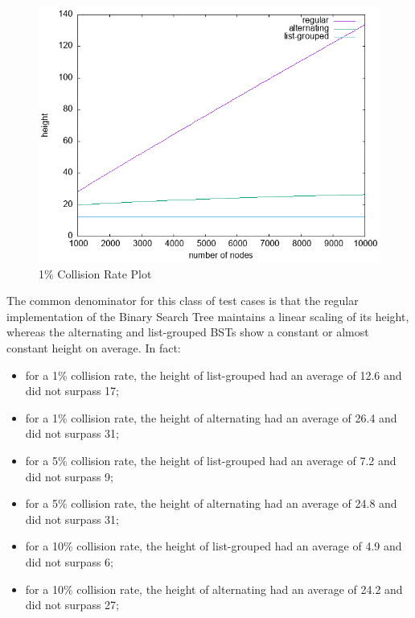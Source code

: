 \documentclass[fleqn,10pt]{SelfArx} %
\begin{document}
\begin{figure}[ht]\centering
	\includegraphics[width=\linewidth]{Figures/1_plot.png}
	\caption{1\% Collision Rate Plot}
	\label{fig:1_plot}
\end{figure}

The common denominator for this class of test cases is that the regular implementation of the Binary Search Tree maintains a linear scaling of its height, whereas the alternating and list-grouped BSTs show a constant or almost constant height on average. In fact:
\begin{itemize}
	\item for a 1\% collision rate, the height of list-grouped had an average of 12.6 and did not surpass 17;
	\item for a 1\% collision rate, the height of alternating had an average of 26.4 and did not surpass 31;
	\item for a 5\% collision rate, the height of list-grouped had an average of 7.2 and did not surpass 9;
	\item for a 5\% collision rate, the height of alternating had an average of 24.8 and did not surpass 31;
	\item for a 10\% collision rate, the height of list-grouped had an average of 4.9 and did not surpass 6;
	\item for a 10\% collision rate, the height of alternating had an average of 24.2 and did not surpass 27;
\end{itemize}
\end{document}
